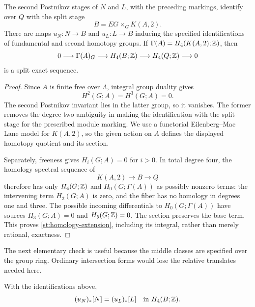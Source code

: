\begin{lemma}\label{st:second-stage}
The second Postnikov stages of $N$ and $L$, with the preceding markings,
identify over $Q$ with the split stage
\[
 B=EG\times_G K(A,2).
\]
There are maps $u_N\colon N\to B$ and $u_L\colon L\to B$ inducing the
specified identifications of fundamental and second homotopy groups.
If $\Gamma(A)=H_4(K(A,2);\mathbb Z)$, then
\begin{equation}\label{st:homology-extension}
 0\longrightarrow\Gamma(A)_G\longrightarrow H_4(B;\mathbb Z)
 \longrightarrow H_4(Q;\mathbb Z)\longrightarrow0
\end{equation}
is a split exact sequence.
\end{lemma}

\begin{proof}
Since $A$ is finite free over $\Lambda$, integral group duality gives
\begin{equation}\label{st:cohomology-vanishing}
 H^2(G;A)=H^3(G;A)=0.
\end{equation}
The second Postnikov invariant lies in the latter group, so it vanishes.
The former removes the degree-two ambiguity in making the identification
with the split stage for the prescribed module marking.  We use a
functorial Eilenberg--Mac Lane model for $K(A,2)$, so the given action on
$A$ defines the displayed homotopy quotient and its section.

Separately, freeness gives $H_i(G;A)=0$ for $i>0$.  In total degree four,
the homology spectral sequence of
\[
 K(A,2)\longrightarrow B\longrightarrow Q
\]
therefore has only $H_4(G;\mathbb Z)$ and $H_0(G;\Gamma(A))$ as possibly
nonzero terms: the intervening term $H_2(G;A)$ is zero, and the fiber has
no homology in degrees one and three.  The possible incoming
differentials to $H_0(G;\Gamma(A))$ have sources $H_3(G;A)=0$ and
$H_5(G;\mathbb Z)=0$.  The section preserves the base term.  This proves
\eqref{st:homology-extension}, including its integral, rather than merely
rational, exactness.
\end{proof}

The next elementary check is useful because the middle classes are
specified over the group ring.  Ordinary intersection forms would lose
the relative translates needed here.

\begin{lemma}\label{st:quadratic-detection}
With the identifications above,
\begin{equation}\label{st:fundamental-equality}
 (u_N)_*[N]=(u_L)_*[L]\quad\text{in }H_4(B;\mathbb Z).
\end{equation}
\end{lemma}

